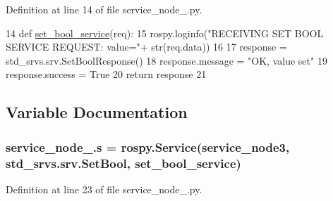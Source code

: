 Definition at line 14 of file service\+\_\+node\+\_.\+py.


\begin{DoxyCode}
14   \textcolor{keyword}{def }\hyperlink{namespaceservice__node__3_aa39c33f9a42c780241389c2359197ea0}{set\_bool\_service}(req):
15       rospy.loginfo(\textcolor{stringliteral}{"RECEIVING SET BOOL SERVICE REQUEST: value="}+ str(req.data))
16 
17       response = std\_srvs.srv.SetBoolResponse()
18       response.message = \textcolor{stringliteral}{"OK, value set"}
19       response.success = \textcolor{keyword}{True}
20       \textcolor{keywordflow}{return} response
21 
\end{DoxyCode}


\subsection{Variable Documentation}
\subsubsection[{\texorpdfstring{s}{s}}]{\setlength{\rightskip}{0pt plus 5cm}service\+\_\+node\+\_.\+s = rospy.\+Service(\textquotesingle{}service\+\_\+node3\textquotesingle{}, std\+\_\+srvs.\+srv.\+Set\+Bool, {\bf set\+\_\+bool\+\_\+service})}\hypertarget{namespaceservice__node__3_aa976421a49e0b54f23833423400849ae}{}\label{namespaceservice__node__3_aa976421a49e0b54f23833423400849ae}


Definition at line 23 of file service\+\_\+node\+\_.\+py.

